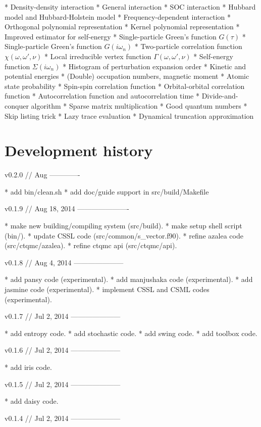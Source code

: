 * Density-density interaction
* General interaction
* SOC interaction
* Hubbard model and Hubbard-Holstein model
* Frequency-dependent interaction
* Orthogonal polynomial representation
* Kernel polynomial representation
* Improved estimator for self-energy
* Single-particle Green’s function $G(\tau)$
* Single-particle Green’s function $G(i\omega_n)$
* Two-particle correlation function $\chi(\omega, \omega', \nu)$
* Local irreducible vertex function $\Gamma(\omega, \omega', \nu)$
* Self-energy function $\Sigma(i\omega_n)$
* Histogram of perturbation expansion order
* Kinetic and potential energies
* (Double) occupation numbers, magnetic moment
* Atomic state probability
* Spin-spin correlation function
* Orbital-orbital correlation function
* Autocorrelation function and autocorrelation time
* Divide-and-conquer algorithm
* Sparse matrix multiplication
* Good quantum numbers
* Skip listing trick
* Lazy trace evaluation
* Dynamical truncation approximation


\section{Development history}

v0.2.0 // Aug
-------------

* add bin/clean.sh
* add doc/guide support in src/build/Makefile


v0.1.9 // Aug 18, 2014
----------------------

* make new building/compiling system (src/build).
* make setup shell script (bin/).
* update CSSL code (src/common/s\_vector.f90).
* refine azalea code (src/ctqmc/azalea).
* refine ctqmc api (src/ctqmc/api).


v0.1.8 // Aug 4, 2014
---------------------

* add pansy code (experimental).
* add manjushaka code (experimental).
* add jasmine code (experimental).
* implement CSSL and CSML codes (experimental).


v0.1.7 // Jul 2, 2014
---------------------

* add entropy code.
* add stochastic code.
* add swing code.
* add toolbox code.


v0.1.6 // Jul 2, 2014
---------------------

* add iris code.


v0.1.5 // Jul 2, 2014
---------------------

* add daisy code.


v0.1.4 // Jul 2, 2014
---------------------

